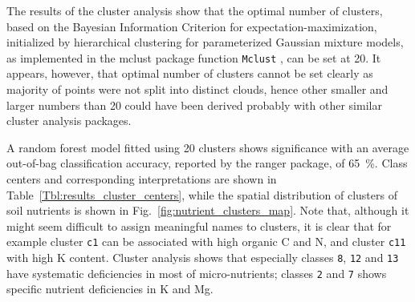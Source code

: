 \begin{linenumbers}
The results of the cluster analysis show that the optimal number of clusters, based on the Bayesian Information Criterion for expectation-maximization, initialized by hierarchical clustering for parameterized Gaussian mixture models, as implemented in the \textsf{mclust} package function \texttt{Mclust} \citep{fraley2012package}, can be set at 20. It appears, however, that optimal number of clusters cannot be set clearly as majority of points were not split into distinct clouds, hence other smaller and larger numbers than 20 could have been derived probably with other similar cluster analysis packages.\par 

A random forest model fitted using 20 clusters shows significance with an average out-of-bag classification accuracy, reported by the \textsf{ranger} package, of \SI{65}{\percent}. Class centers and corresponding interpretations are shown in Table~\ref{Tbl:results_cluster_centers}, while the spatial distribution of clusters of soil nutrients is shown in Fig.\@~\ref{fig:nutrient_clusters_map}. Note that, although it might seem difficult to assign meaningful names to clusters, it is clear that for example cluster \verb"c1" can be associated with high organic C and N, and cluster \verb"c11" with high K content. Cluster analysis shows that especially classes \texttt{8}, \texttt{12} and \texttt{13} have systematic deficiencies in most of micro-nutrients; classes \texttt{2} and \texttt{7} shows specific nutrient deficiencies in K and Mg. \par

\clearpage


\end{linenumbers}
